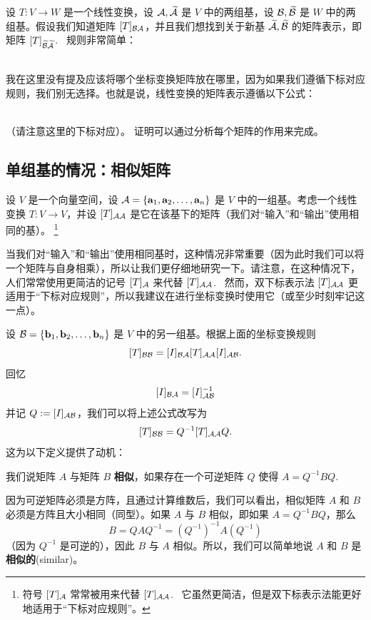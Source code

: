 设 $T: V \to W$ 是一个线性变换，设 $\mathcal{A}, \widetilde{\mathcal{A}}$ 是 $V$ 中的两组基，设 $\mathcal{B}, \widetilde{\mathcal{B}}$ 是 $W$ 中的两组基。假设我们知道矩阵 $[T]_{\mathcal{B}\mathcal{A}}$，并且我们想找到关于新基 $\widetilde{\mathcal{A}}, \widetilde{\mathcal{B}}$ 的矩阵表示，即矩阵 $[T]_{\widetilde{\mathcal{B}}\widetilde{\mathcal{A}}}$. ~规则非常简单：

\\
我在这里没有提及应该将哪个坐标变换矩阵放在哪里，因为如果我们遵循下标对应规则，我们别无选择。也就是说，线性变换的矩阵表示遵循以下公式：

\fbox{
$
[T]_{\widetilde{\B}\widetilde{\A}} = [I]_{\widetilde{\B}\B} [T]_{\B\A} [I]_{\A\widetilde{\A}}
$
}
\\
（请注意这里的下标对应）。
证明可以通过分析每个矩阵的作用来完成。

\subsection{单组基的情况：相似矩阵}\label{sec:02-08-05}

设 $V$ 是一个向量空间，设 $\mathcal{A} = \{\mathbf{a}_1, \mathbf{a}_2, \dots, \mathbf{a}_n\}$ 是 $V$ 中的一组基。考虑一个线性变换 $T: V \to V$，并设 $[T]_{\mathcal{A}\mathcal{A}}$ 是它在该基下的矩阵（我们对“输入”和“输出”使用相同的基）。
\footnote{
符号 $[T]_{\mathcal{A}}$ 常常被用来代替 $[T]_{\mathcal{A}\mathcal{A}}$. ~它虽然更简洁，但是双下标表示法能更好地适用于“下标对应规则”。
}

当我们对“输入”和“输出”使用相同基时，这种情况非常重要（因为此时我们可以将一个矩阵与自身相乘），所以让我们更仔细地研究一下。请注意，在这种情况下，人们常常使用更简洁的记号 $[T]_{\mathcal{A}}$ 来代替 $[T]_{\mathcal{A}\mathcal{A}}$. ~然而，双下标表示法 $[T]_{\mathcal{A}\mathcal{A}}$ 更适用于“下标对应规则”，所以我建议在进行坐标变换时使用它（或至少时刻牢记这一点）。

设 $\mathcal{B} = \{\mathbf{b}_1, \mathbf{b}_2, \dots, \mathbf{b}_n\}$ 是 $V$ 中的另一组基。根据上面的坐标变换规则
$$[T]_{\mathcal{B}\mathcal{B}} = [I]_{\mathcal{B}\mathcal{A}} [T]_{\mathcal{A}\mathcal{A}} [I]_{\mathcal{A}\mathcal{B}}.$$
回忆
$$[I]_{\mathcal{B}\mathcal{A}} = [I]_{\mathcal{A}\mathcal{B}}^{-1}$$
并记 $Q := [I]_{\mathcal{A}\mathcal{B}}$，我们可以将上述公式改写为
$$[T]_{\mathcal{B}\mathcal{B}} = Q^{-1} [T]_{\mathcal{A}\mathcal{A}} Q.$$
这为以下定义提供了动机：

\begin{definition}\label{stmt:02-08-01}
我们说矩阵 $A$ 与矩阵 $B$ \textbf{相似}，如果存在一个可逆矩阵 $Q$ 使得 $A = Q^{-1} BQ$. ~
\end{definition}

因为可逆矩阵必须是方阵，且通过计算维数后，我们可以看出，相似矩阵 $A$ 和 $B$ 必须是方阵且大小相同（同型）。如果 $A$ 与 $B$ 相似，即如果 $A = Q^{-1} BQ$，那么 $$B = Q A Q^{-1} = (Q^{-1})^{-1} A (Q^{-1})$$
（因为 $Q^{-1}$ 是可逆的），因此 $B$ 与 $A$ 相似。所以，我们可以简单地说 $A$ 和 $B$ 是\textbf{相似的}(similar)。

